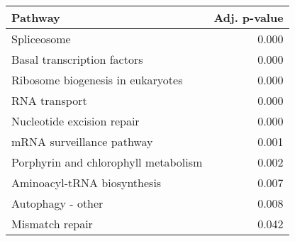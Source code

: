 \begin{tabular}{lr}
\toprule
                              Pathway &  Adj. p-value \\
\midrule
                          Spliceosome &         0.000 \\
          Basal transcription factors &         0.000 \\
    Ribosome biogenesis in eukaryotes &         0.000 \\
                        RNA transport &         0.000 \\
           Nucleotide excision repair &         0.000 \\
            mRNA surveillance pathway &         0.001 \\
 Porphyrin and chlorophyll metabolism &         0.002 \\
          Aminoacyl-tRNA biosynthesis &         0.007 \\
                    Autophagy - other &         0.008 \\
                      Mismatch repair &         0.042 \\
\bottomrule
\end{tabular}
